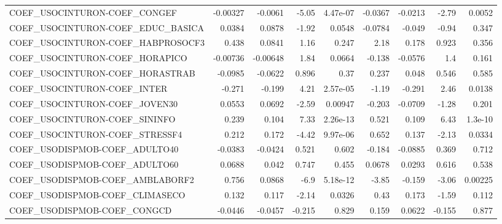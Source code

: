 \begin{tabular}{lrrrrrrrr}
COEF\_USOCINTURON-COEF\_CONGEF           &    -0.00327 &      -0.0061 &   -5.05 & 4.47e-07 &    -0.0367 &     -0.0213 &        -2.79 &        0.0052 \\
COEF\_USOCINTURON-COEF\_EDUC\_BASICA      &      0.0384 &       0.0878 &   -1.92 &   0.0548 &    -0.0784 &      -0.049 &        -0.94 &         0.347 \\
COEF\_USOCINTURON-COEF\_HABPROSOCF3      &       0.438 &       0.0841 &    1.16 &    0.247 &       2.18 &       0.178 &        0.923 &         0.356 \\
COEF\_USOCINTURON-COEF\_HORAPICO         &    -0.00736 &     -0.00648 &    1.84 &   0.0664 &     -0.138 &     -0.0576 &          1.4 &         0.161 \\
COEF\_USOCINTURON-COEF\_HORASTRAB        &     -0.0985 &      -0.0622 &   0.896 &     0.37 &      0.237 &       0.048 &        0.546 &         0.585 \\
COEF\_USOCINTURON-COEF\_INTER            &      -0.271 &       -0.199 &    4.21 & 2.57e-05 &      -1.19 &      -0.291 &         2.46 &        0.0138 \\
COEF\_USOCINTURON-COEF\_JOVEN30          &      0.0553 &       0.0692 &   -2.59 &  0.00947 &     -0.203 &     -0.0709 &        -1.28 &         0.201 \\
COEF\_USOCINTURON-COEF\_SININFO          &       0.239 &        0.104 &    7.33 & 2.26e-13 &      0.521 &       0.109 &         6.43 &       1.3e-10 \\
COEF\_USOCINTURON-COEF\_STRESSF4         &       0.212 &        0.172 &   -4.42 & 9.97e-06 &      0.652 &       0.137 &        -2.13 &        0.0334 \\
COEF\_USODISPMOB-COEF\_ADULTO40          &     -0.0383 &      -0.0424 &   0.521 &    0.602 &     -0.184 &     -0.0885 &        0.369 &         0.712 \\
COEF\_USODISPMOB-COEF\_ADULTO60          &      0.0688 &        0.042 &   0.747 &    0.455 &     0.0678 &      0.0293 &        0.616 &         0.538 \\
COEF\_USODISPMOB-COEF\_AMBLABORF2        &       0.756 &       0.0868 &    -6.9 & 5.18e-12 &      -3.85 &      -0.159 &        -3.06 &       0.00225 \\
COEF\_USODISPMOB-COEF\_CLIMASECO         &       0.132 &        0.117 &   -2.14 &   0.0326 &       0.43 &       0.173 &        -1.59 &         0.112 \\
COEF\_USODISPMOB-COEF\_CONGCD            &     -0.0446 &      -0.0457 &  -0.215 &    0.829 &      0.159 &      0.0622 &       -0.155 &         0.877 \\

\end{tabular}
